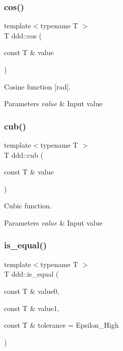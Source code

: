 \subsubsection{\texorpdfstring{cos()}{cos()}}
{\footnotesize\ttfamily template$<$typename T $>$ \\
T ddd\+::cos (\begin{DoxyParamCaption}\item[{const T \&}]{value }\end{DoxyParamCaption})\hspace{0.3cm}{\ttfamily [inline]}}



Cosine function \mbox{[}rad\mbox{]}. 


\begin{DoxyParams}{Parameters}
{\em value} & Input value \\
\hline
\end{DoxyParams}
\mbox{\label{namespaceddd_abbdb4782fa0a78950fd49de0d5766dd2}} 
\subsubsection{\texorpdfstring{cub()}{cub()}}
{\footnotesize\ttfamily template$<$typename T $>$ \\
T ddd\+::cub (\begin{DoxyParamCaption}\item[{const T \&}]{value }\end{DoxyParamCaption})\hspace{0.3cm}{\ttfamily [inline]}}



Cubic function. 


\begin{DoxyParams}{Parameters}
{\em value} & Input value \\
\hline
\end{DoxyParams}
\mbox{\label{namespaceddd_a7d68733d32a94776596a8e213ae9fcdf}} 
\subsubsection{\texorpdfstring{is\+\_\+equal()}{is\_equal()}}
{\footnotesize\ttfamily template$<$typename T $>$ \\
T ddd\+::is\+\_\+equal (\begin{DoxyParamCaption}\item[{const T \&}]{value0,  }\item[{const T \&}]{value1,  }\item[{const T \&}]{tolerance = {\ttfamily Epsilon\+\_\+High} }\end{DoxyParamCaption})\hspace{0.3cm}{\ttfamily [inline]}}



